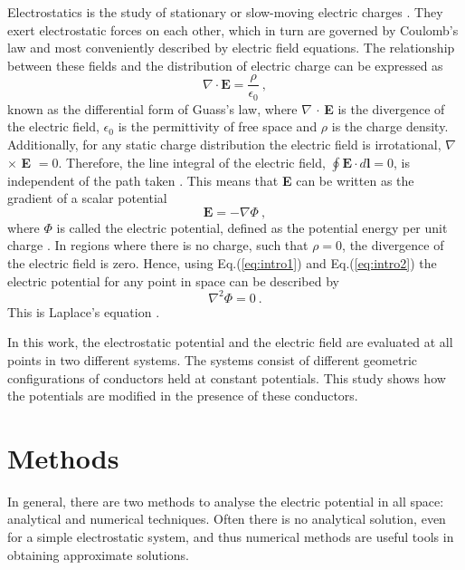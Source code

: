 \documentclass[a4paper]{jpconf}
\begin{document}
Electrostatics is the study of stationary or slow-moving electric charges \cite{griffiths-introElec}. They exert electrostatic forces on each other, which in turn are governed by Coulomb's law and most conveniently described by electric field equations. The relationship between these fields and the distribution of electric charge can be expressed as \cite{griffiths-introElec}
\begin{equation}
\textbf{$\nabla$} \cdot \textbf{E} = \frac{\rho}{\epsilon_0}~,
\label{eq:intro1}
\end{equation} known as the differential form of Guass's law, where \textbf{$\nabla$} $\cdot$ \textbf{E} is the divergence of the electric field, $\epsilon_0$ is the permittivity of free space and $\rho$ is the charge density. Additionally, for any static charge distribution the electric field is irrotational, \textbf{$\nabla$} $\times$ \textbf{E} $= 0$. Therefore, the line integral of the electric field, $\oint \textbf{E} \cdot d \textbf{l} = 0$, is independent of the path taken \cite{griffiths-introElec}. This means that \textbf{E} can be written as the gradient of a scalar potential 
\begin{equation}
\textbf{E} = - \nabla \Phi~,
\label{eq:intro2}
\end{equation} where $\Phi$ is called the electric potential, defined as the potential energy per unit charge  \cite{Sears.Zamansky-uniPhy}.
In regions where there is no charge, such that $\rho = 0$, the divergence of the electric field is zero. Hence, using Eq.(\ref{eq:intro1}) and Eq.(\ref{eq:intro2}) the electric potential for any point in space can be described by
\begin{equation}
\nabla^2 \Phi = 0~.
\label{eq:intro3}
\end{equation} This is Laplace's equation \cite{RHB-MathematicalMethods}.\\ \par
In this work, the electrostatic potential and the electric field are evaluated at all points in two different systems. The systems consist of different geometric configurations of conductors held at constant potentials. This study shows how the potentials are modified in the presence of these conductors. 

\section*{Methods}
In general, there are two methods to analyse the electric potential in all space: analytical and numerical techniques. Often there is no analytical solution, even for a simple electrostatic system, and thus numerical methods are useful tools in obtaining approximate solutions. 
\end{document}
